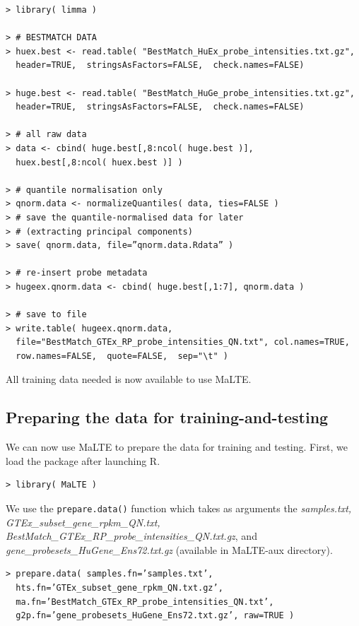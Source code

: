 \documentclass[a4paper,12pt]{article}
\begin{document}
\begin{verbatim}
> library( limma )

> # BESTMATCH DATA
> huex.best <- read.table( "BestMatch_HuEx_probe_intensities.txt.gz", 
  header=TRUE,  stringsAsFactors=FALSE,  check.names=FALSE)

> huge.best <- read.table( "BestMatch_HuGe_probe_intensities.txt.gz", 
  header=TRUE,  stringsAsFactors=FALSE,  check.names=FALSE)

> # all raw data
> data <- cbind( huge.best[,8:ncol( huge.best )], 
  huex.best[,8:ncol( huex.best )] )

> # quantile normalisation only
> qnorm.data <- normalizeQuantiles( data, ties=FALSE )
> # save the quantile-normalised data for later 
> # (extracting principal components)
> save( qnorm.data, file=”qnorm.data.Rdata” )

> # re-insert probe metadata
> hugeex.qnorm.data <- cbind( huge.best[,1:7], qnorm.data )

> # save to file
> write.table( hugeex.qnorm.data, 
  file="BestMatch_GTEx_RP_probe_intensities_QN.txt", col.names=TRUE, 
  row.names=FALSE,  quote=FALSE,  sep="\t" )
\end{verbatim}

All training data needed is now available to use \textsf{MaLTE}.

\subsection{Preparing the data for training-and-testing}

We can now use \textsf{MaLTE} to prepare the data for training and testing. First, we load the package after launching \textsf{R}.

\begin{verbatim}
> library( MaLTE )
\end{verbatim}

We use the \texttt{prepare.data()} function which takes as arguments the \textit{samples.txt,\\ GTEx\_subset\_gene\_rpkm\_QN.txt, BestMatch\_GTEx\_RP\_probe\_intensities\_QN.txt.gz}, and\\ \textit{gene\_probesets\_HuGene\_Ens72.txt.gz} (available in \textsf{MaLTE-aux} directory).

\begin{verbatim}
> prepare.data( samples.fn=’samples.txt’, 
  hts.fn=’GTEx_subset_gene_rpkm_QN.txt.gz’,
  ma.fn=’BestMatch_GTEx_RP_probe_intensities_QN.txt’,
  g2p.fn=’gene_probesets_HuGene_Ens72.txt.gz’, raw=TRUE )
\end{verbatim}
\end{document}

